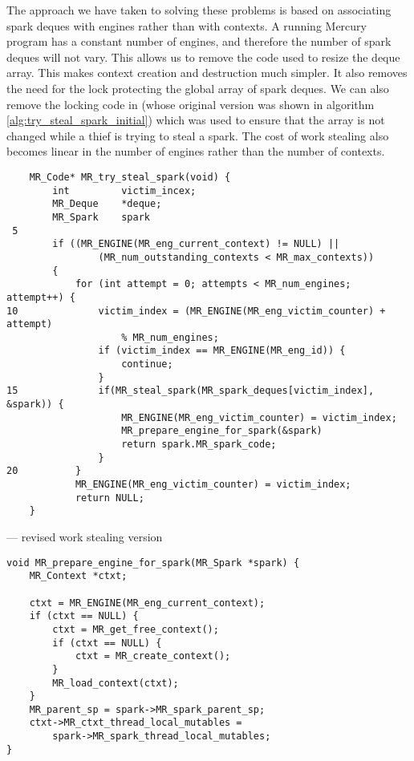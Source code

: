 The approach we have taken to solving these problems is based on associating
spark deques with engines rather than with contexts.
A running Mercury program has a constant number of engines,
and therefore the number of spark deques will not vary.
This allows us to remove the code used to resize the deque array.
This makes context creation and destruction much simpler.
It also removes the need for the lock protecting the global array of spark
deques.
We can also remove the locking code in \trystealspark
(whose original version was shown in algorithm
\ref{alg:try_steal_spark_initial})
which was used to
ensure that the array is not changed while a thief is trying to steal a
spark.
The cost of work stealing also becomes linear in the number of engines
rather than the number of contexts.

\begin{algorithm}[tbp]
\begin{verbatim}
    MR_Code* MR_try_steal_spark(void) {
        int         victim_incex;
        MR_Deque    *deque;
        MR_Spark    spark
 5
        if ((MR_ENGINE(MR_eng_current_context) != NULL) ||
                (MR_num_outstanding_contexts < MR_max_contexts))
        {
            for (int attempt = 0; attempts < MR_num_engines; attempt++) {
10              victim_index = (MR_ENGINE(MR_eng_victim_counter) + attempt)
                    % MR_num_engines;
                if (victim_index == MR_ENGINE(MR_eng_id)) {
                    continue;
                }
15              if(MR_steal_spark(MR_spark_deques[victim_index], &spark)) {
                    MR_ENGINE(MR_eng_victim_counter) = victim_index;
                    MR_prepare_engine_for_spark(&spark)
                    return spark.MR_spark_code;
                }
20          }
            MR_ENGINE(MR_eng_victim_counter) = victim_index;
            return NULL;
    }
\end{verbatim}
\caption{\trystealspark --- revised work stealing version}
\label{alg:try_steal_spark_revised}
\end{algorithm}

\begin{algorithm}[tbp]
\begin{verbatim}
void MR_prepare_engine_for_spark(MR_Spark *spark) {
    MR_Context *ctxt;

    ctxt = MR_ENGINE(MR_eng_current_context);
    if (ctxt == NULL) {
        ctxt = MR_get_free_context();
        if (ctxt == NULL) {
            ctxt = MR_create_context();
        }
        MR_load_context(ctxt);
    }
    MR_parent_sp = spark->MR_spark_parent_sp;
    ctxt->MR_ctxt_thread_local_mutables =
        spark->MR_spark_thread_local_mutables;
}
\end{verbatim}
\caption{\prepareengineforspark}
\label{alg:prepare_engine_for_spark}
\end{algorithm}

